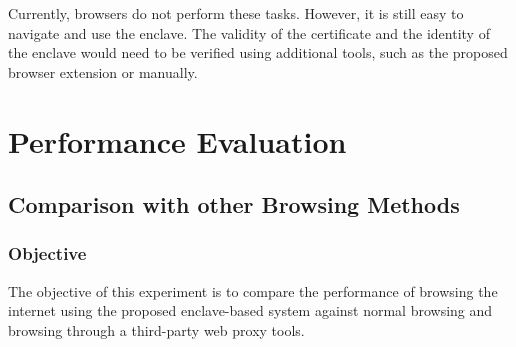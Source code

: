 Currently, browsers do not perform these tasks. However, it is still easy to navigate and use the enclave. The validity of the certificate and the identity of the enclave would need to be verified using additional tools, such as the proposed browser extension or manually.

\section{Performance Evaluation}

\subsection{Comparison with other Browsing Methods} \label{experiment-1}
\subsubsection{Objective}
The objective of this experiment is to compare the performance of browsing the internet using the proposed enclave-based system against normal browsing and browsing through a third-party web proxy tools.

